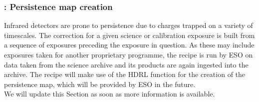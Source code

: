 \subsubsection{: Persistence map creation}
\label{sssec:metis_det_persistence}
\label{rec:metis_det_persistence}

Infrared detectors are prone to persistence due to charges trapped on a variety of timescales. The correction for a given science or
calibration exposure is built from a sequence of exposures preceding the exposure in question. As these may include exposures taken for another proprietary programme, the recipe is run by ESO on data taken from the science archive and its products are again ingested into the archive. The recipe will make use of the \ac{HDRL} function for the creation of the persistence map, which will be provided by \ac{ESO} in the future.\\
We will update this Section as soon as more information is available.






